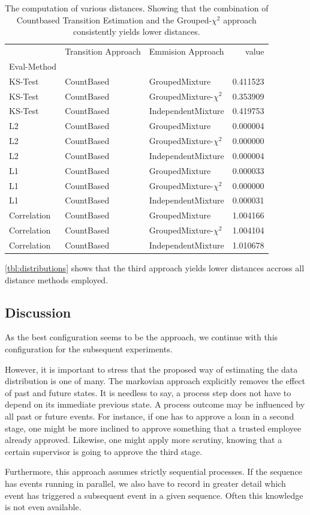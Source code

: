 \documentclass[./../../paper.tex]{subfiles}
\begin{document}
\begin{table}
    \caption{The computation of various distances. Showing that the combination of Countbased Transition Estimation and the Grouped-$\chi^2$ approach consistently yields lower distances.}
    \label{tbl:distributions}
    \begin{tabular}{lllr}
     & Transition Approach & Emmision Approach & value \\
    Eval-Method &  &  &  \\
    KS-Test & CountBased & GroupedMixture & 0.411523 \\
    KS-Test & CountBased & GroupedMixture-$\chi^2$ & 0.353909 \\
    KS-Test & CountBased & IndependentMixture & 0.419753 \\
    L2 & CountBased & GroupedMixture & 0.000004 \\
    L2 & CountBased & GroupedMixture-$\chi^2$ & 0.000000 \\
    L2 & CountBased & IndependentMixture & 0.000004 \\
    L1 & CountBased & GroupedMixture & 0.000033 \\
    L1 & CountBased & GroupedMixture-$\chi^2$ & 0.000000 \\
    L1 & CountBased & IndependentMixture & 0.000031 \\
    Correlation & CountBased & GroupedMixture & 1.004166 \\
    Correlation & CountBased & GroupedMixture-$\chi^2$ & 1.004104 \\
    Correlation & CountBased & IndependentMixture & 1.010678 \\
    \end{tabular}
\end{table}

\autoref{tbl:distributions} shows that the third approach yields lower distances accross all distance methods employed.

\subsection{Discussion}
As the best configuration seems to be the  approach, we continue with this configuration for the subsequent experiments.

However, it is important to stress that the proposed way of estimating the data distribution is one of many. The markovian approach explicitly removes the effect of past and future states. It is needless to say, a process step does not have to depend on its immediate previous state. A process outcome may be influenced by all past or future events. For instance, if one has to approve a loan in a second stage, one might be more inclined to approve something that a trusted employee already approved. Likewise, one might apply more scrutiny, knowing that a certain supervisor is going to approve the third stage.

Furthermore, this approach assumes strictly sequential processes. If the sequence has events running in parallel, we also have to record in greater detail which event has triggered a subsequent event in a given sequence. Often this knowledge is not even available.

\end{document}

